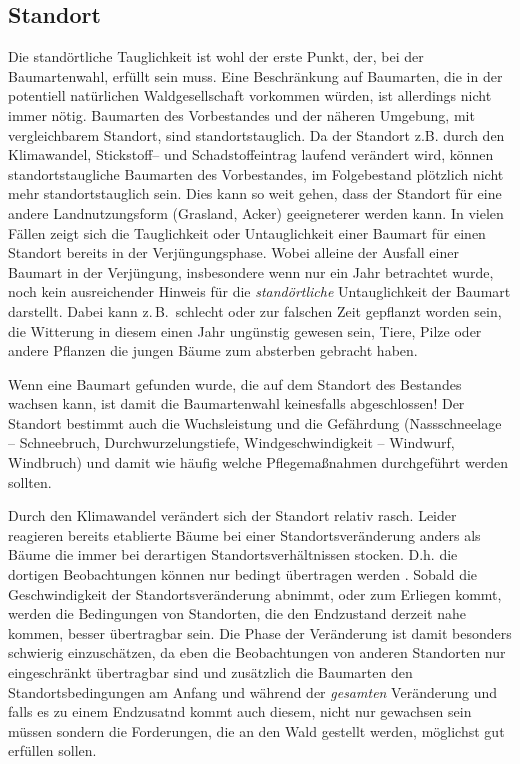 \documentclass[twocolumn]{scrartcl}
\begin{document}
\subsection{Standort}
\label{ssec:standort}

Die standörtliche Tauglichkeit ist wohl der erste Punkt, der, bei der
Baumartenwahl, erfüllt sein muss. Eine Beschränkung auf Baumarten, die
in der potentiell natürlichen Waldgesellschaft vorkommen würden, ist
allerdings nicht immer nötig. Baumarten des Vorbestandes und der
näheren Umgebung, mit vergleichbarem Standort, sind
standortstauglich. Da der Standort z.B. durch den Klimawandel,
Stickstoff-- und Schadstoffeintrag laufend verändert wird, können
standortstaugliche Baumarten des Vorbestandes, im Folgebestand
plötzlich nicht mehr standortstauglich sein. Dies kann so weit gehen,
dass der Standort für eine andere Landnutzungsform (Grasland, Acker)
geeigneterer werden kann. In vielen Fällen zeigt sich die Tauglichkeit
oder Untauglichkeit einer Baumart für einen Standort bereits in der
Verjüngungsphase. Wobei alleine der Ausfall einer Baumart in der
Verjüngung, insbesondere wenn nur ein Jahr betrachtet wurde, noch kein
ausreichender Hinweis für die \emph{standörtliche} Untauglichkeit der
Baumart darstellt. Dabei kann z.\,B.\ schlecht oder zur falschen Zeit
gepflanzt worden sein, die Witterung in diesem einen Jahr ungünstig
gewesen sein, Tiere, Pilze oder andere Pflanzen die jungen Bäume zum
absterben gebracht haben.

Wenn eine Baumart gefunden wurde, die auf dem Standort des Bestandes
wachsen kann, ist damit die Baumartenwahl keinesfalls abgeschlossen!
Der Standort bestimmt auch die Wuchsleistung und die Gefährdung
(Nassschneelage -- Schneebruch, Durchwurzelungstiefe,
Windgeschwindigkeit -- Windwurf, Windbruch) und damit wie häufig
welche Pflegemaßnahmen durchgeführt werden sollten.

Durch den Klimawandel verändert sich der Standort relativ
rasch. Leider reagieren bereits etablierte Bäume bei einer
Standortsveränderung anders als Bäume die immer bei derartigen
Standortsverhältnissen stocken. D.h. die dortigen Beobachtungen können
nur bedingt übertragen werden \cite{yue2022SiteIndex}. Sobald die
Geschwindigkeit der Standortsveränderung abnimmt, oder zum Erliegen
kommt, werden die Bedingungen von Standorten, die den Endzustand
derzeit nahe kommen, besser übertragbar sein. Die Phase der
Veränderung ist damit besonders schwierig einzuschätzen, da eben die
Beobachtungen von anderen Standorten nur eingeschränkt übertragbar
sind und zusätzlich die Baumarten den Standortsbedingungen am Anfang
und während der \emph{gesamten} Veränderung und falls es zu einem
Endzusatnd kommt auch diesem, nicht nur gewachsen sein müssen sondern
die Forderungen, die an den Wald gestellt werden, möglichst gut
erfüllen sollen.
\end{document}
